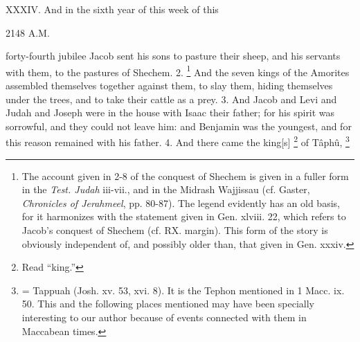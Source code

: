 
XXXIV. And in the sixth year of this week of this

2148 A.M.

forty-fourth jubilee Jacob sent his sons to pasture their sheep, and his servants with them, to the pastures of Shechem. 2. \footnote{The account given in 2-8 of the conquest of Shechem is given in a fuller form in the \emph{Test. Judah} iii-vii., and in the Midrash Wajjissau (cf. Gaster, \emph{Chronicles of Jerahmeel}, pp. 80-87). The legend evidently has an old basis, for it harmonizes with the statement given in Gen. xlviii. 22, which refers to Jacob's conquest of Shechem (cf. RX. margin). This form of the story is obviously independent of, and possibly older than, that given in Gen. xxxiv.} And the seven kings of the Amorites assembled themselves together against them, to slay them, hiding themselves under the trees, and to take their cattle as a prey. 3. And Jacob and Levi and Judah and Joseph were in the house with Isaac their father; for his spirit was sorrowful, and they could not leave him: and Benjamin was the youngest, and for this reason remained with his father. 4. And there came the king[s] \footnote{Read ``king.''} of Tâphû, \footnote{= Tappuah (Josh. xv. 53, xvi. 8). It is the Tephon mentioned in 1 Macc. ix. 50. This and the following places mentioned may have been specially interesting to our author because of events connected with them in Maccabean times.}

